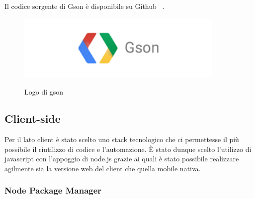 \noindent Il codice sorgente di Gson è disponibile su Github ~\cite{googlegs79:online}.

\begin{figure}[H]
    \caption{Logo di gson ~\cite{googlegs79:online}}
    \centering
    \includegraphics[width=100mm]{img/logos/gson_logo.png}
    \label{fig:gson_logo}
\end{figure}

\subsection{Client-side}
Per il lato client è stato scelto uno stack tecnologico che ci permettesse il più possibile il riutilizzo di codice e l'automazione.\newline
È stato dunque scelto l'utilizzo di javascript con l'appoggio di node.js grazie ai quali è stato possibile realizzare agilmente sia la versione web del client che quella mobile nativa.\newline
\label{sub:client-tech}
\subsubsection{Node Package Manager}

